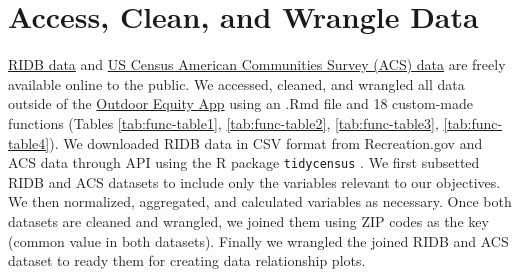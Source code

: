 \documentclass[
]{book}
\begin{document}
\hypertarget{access-clean-and-wrangle-data}{%
\section{Access, Clean, and Wrangle Data}\label{access-clean-and-wrangle-data}}

\href{https://ridb.recreation.gov/}{RIDB data} and \href{https://www.census.gov/programs-surveys/acs/data.html}{US Census American Communities Survey (ACS) data} are freely available online to the public. We accessed, cleaned, and wrangled all data outside of the \href{https://shinyapps.bren.ucsb.edu/oe_app/}{Outdoor Equity App} using an .Rmd file and 18 custom-made functions (Tables \ref{tab:func-table1}, \ref{tab:func-table2}, \ref{tab:func-table3}, \ref{tab:func-table4}). We downloaded RIDB data in CSV format from Recreation.gov and ACS data through API using the R package \texttt{tidycensus} \citep{R-tidycensus}. We first subsetted RIDB and ACS datasets to include only the variables relevant to our objectives. We then normalized, aggregated, and calculated variables as necessary. Once both datasets are cleaned and wrangled, we joined them using ZIP codes as the key (common value in both datasets). Finally we wrangled the joined RIDB and ACS dataset to ready them for creating data relationship plots.
\end{document}
